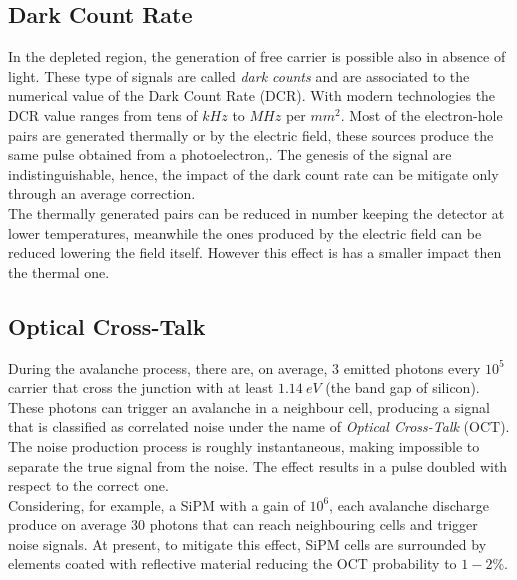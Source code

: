 \subsection{Dark Count Rate}
In the depleted region, the generation of free carrier is possible also in absence of light. These type of signals are called \textit{dark counts} and are associated to the numerical value of the Dark Count Rate (DCR). With modern technologies the DCR value ranges from tens of $kHz$ to $MHz$ per $mm^2$. Most of the electron-hole pairs are generated thermally or by the electric field, these sources produce the same pulse obtained from a photoelectron,. The genesis of the signal are indistinguishable, hence, the impact of the dark count rate can be mitigate only through an average correction.\\
The thermally generated pairs can be reduced in number keeping the detector at lower temperatures, meanwhile the ones produced by the electric field can be reduced lowering the field itself. However this effect is has a smaller impact then the thermal one.\\

\subsection{Optical Cross-Talk}
During the avalanche process, there are, on average, $3$ emitted photons every $10^5$ carrier that cross the junction with at least $1.14\ eV$ (the band gap of silicon). These photons can trigger an avalanche in a neighbour cell, producing a signal that is classified as correlated noise under the name of \textit{Optical Cross-Talk} (OCT).\\
The noise production process is roughly instantaneous, making impossible to separate the true signal from the noise. The effect results in a pulse doubled with respect to the correct one.\\
Considering, for example, a SiPM with a gain of $10^6$, each avalanche discharge produce on average $30$ photons that can reach neighbouring cells and trigger noise signals.
At present, to mitigate this effect, SiPM cells are surrounded by elements coated with reflective material reducing the OCT probability to $1-2\%$.\\

